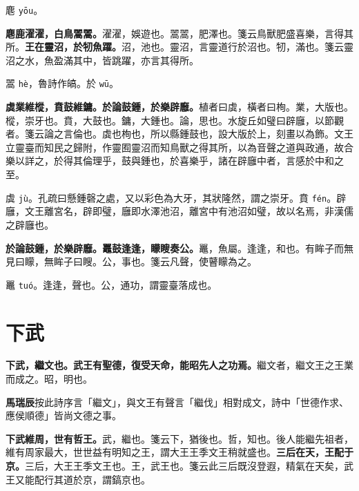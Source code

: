 \begin{quoting}麀 \texttt{yōu}。\end{quoting}

\textbf{麀鹿濯濯，白鳥翯翯。}{\footnotesize 濯濯，娛遊也。翯翯，肥澤也。箋云鳥獸肥盛喜樂，言得其所。}\textbf{王在靈沼，於牣魚躍。}{\footnotesize 沼，池也。靈沼，言靈道行於沼也。牣，滿也。箋云靈沼之水，魚盈滿其中，皆跳躍，亦言其得所。}

\begin{quoting}翯 \texttt{hè}，魯詩作皜。於 \texttt{wū}。\end{quoting}

\textbf{虡業維樅，賁鼓維鏞。於論鼓鍾，於樂辟廱。}{\footnotesize 植者曰虡，橫者曰栒。業，大版也。樅，崇牙也。賁，大鼓也。鏞，大鍾也。論，思也。水旋丘如璧曰辟廱，以節觀者。箋云論之言倫也。虡也栒也，所以縣鍾鼓也，設大版於上，刻畫以為飾。文王立靈臺而知民之歸附，作靈囿靈沼而知鳥獸之得其所，以為音聲之道與政通，故合樂以詳之，於得其倫理乎，鼓與鍾也，於喜樂乎，諸在辟廱中者，言感於中和之至。}

\begin{quoting}虡 \texttt{jù}。孔疏曰懸鍾磬之處，又以彩色為大牙，其狀隆然，謂之崇牙。賁 \texttt{fén}。辟廱，文王離宮名，辟即璧，廱即水澤池沼，離宮中有池沼如璧，故以名焉，非漢儒之辟廱也。\end{quoting}

\textbf{於論鼓鍾，於樂辟廱。鼉鼓逢逢，矇瞍奏公。}{\footnotesize 鼉，魚屬。逢逢，和也。有眸子而無見曰矇，無眸子曰瞍。公，事也。箋云凡聲，使瞽矇為之。}

\begin{quoting}鼉 \texttt{tuó}。逢逢，聲也。公，通功，謂靈臺落成也。\end{quoting}

\section{下武}


\textbf{下武，繼文也。武王有聖德，復受天命，能昭先人之功焉。}{\footnotesize 繼文者，繼文王之王業而成之。昭，明也。}

\begin{quoting}\textbf{馬瑞辰}按此詩序言「繼文」，與文王有聲言「繼伐」相對成文，詩中「世德作求、應侯順德」皆尚文德之事。\end{quoting}

\textbf{下武維周，世有哲王。}{\footnotesize 武，繼也。箋云下，猶後也。哲，知也。後人能繼先祖者，維有周家最大，世世益有明知之王，謂大王王季文王稍就盛也。}\textbf{三后在天，王配于京。}{\footnotesize 三后，大王王季文王也。王，武王也。箋云此三后既沒登遐，精氣在天矣，武王又能配行其道於京，謂鎬京也。}

